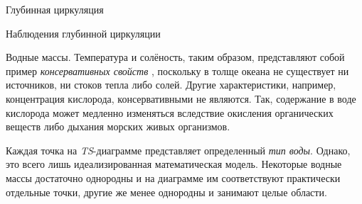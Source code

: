\begin{chapter}{Глубинная циркуляция}
\begin{section}{Наблюдения глубинной циркуляции}
\begin{paragraph}{Водные массы.}
Температура 
и солёность, таким образом, представляют
собой пример \emph{консервативных свойств}%
, поскольку в толще океана не существует
ни источников, ни стоков тепла либо солей. Другие характеристики, например,
концентрация кислорода, консервативными не являются. Так, содержание
в воде кислорода может медленно изменяться вследствие окисления органических
веществ либо дыхания морских живых организмов.
%

Каждая точка на \emph{TS}-диаграмме представляет определенный
\emph{тип воды}. Однако, это
всего лишь идеализированная математическая модель. Некоторые водные массы
достаточно однородны и на диаграмме им соответствуют практически отдельные 
точки, другие же менее однородны и занимают целые области.
%


\end{paragraph}
\end{section}
\end{chapter}

